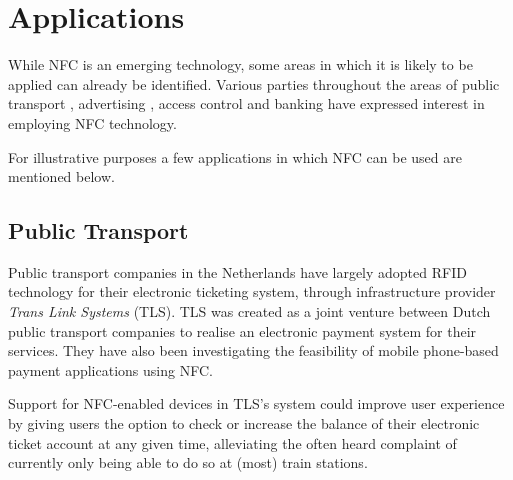 \section{Applications}
\label{sec:applications}
While NFC is an emerging technology, some areas in which it is likely to be applied can already be identified.
Various parties throughout the areas of public transport \cite{OVchipkaart}, advertising \cite{shannon2009profiling}, access control \cite{RFIDHB} and banking \cite{bradford2006paper,ondrus2007assessment} have expressed interest in employing NFC technology.

For illustrative purposes a few applications in which NFC can be used are mentioned below.

\subsection{Public Transport}

Public transport companies in the Netherlands have largely adopted RFID technology for their electronic ticketing system, through infrastructure provider \textit{Trans Link Systems} (TLS).
TLS was created as a joint venture between Dutch public transport companies to realise an electronic payment system for their services.
They have also been investigating the feasibility of mobile phone-based payment applications using NFC. \cite{cipit_artikel}

Support for NFC-enabled devices in TLS's system could improve user experience by giving users the option to check or increase the balance of their electronic ticket account at any given time, alleviating the often heard complaint of currently only being able to do so at (most) train stations.

